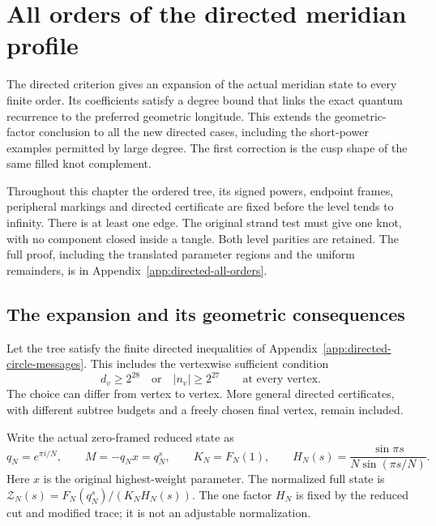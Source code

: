 \chapter{All orders of the directed meridian profile}
\label{ch:directed-all-orders}

The directed criterion gives an expansion of the actual meridian state
to every finite order. Its coefficients satisfy a degree bound that
links the exact quantum recurrence to the preferred geometric
longitude. This extends the geometric-factor conclusion to all the
new directed cases, including the short-power examples permitted by
large degree. The first correction is the cusp shape of the same
filled knot complement.

Throughout this chapter the ordered tree, its signed powers, endpoint
frames, peripheral markings and directed certificate are fixed before
the level tends to infinity. There is at least one edge. The original
strand test must give one knot, with no component closed inside a
tangle. Both level parities are retained. The full proof, including
the translated parameter regions and the uniform remainders, is in
Appendix~\ref{app:directed-all-orders}.

\section{The expansion and its geometric consequences}
\label{dao-ch:statement}

Let the tree satisfy the finite directed inequalities of
Appendix~\ref{app:directed-circle-messages}. This includes the
vertexwise sufficient condition
\begin{equation}\label{dao-ch:sufficient}
 d_v\ge2^{28}\quad\text{or}\quad |n_v|\ge2^{27}
                  \qquad\text{at every vertex}.
\end{equation}
The choice can differ from vertex to vertex. More general directed
certificates, with different subtree budgets and a freely chosen
final vertex, remain included.

Write the actual zero-framed reduced state as
\begin{equation}\label{dao-ch:state}
 q_N=e^{\pi i/N},\qquad M=-q_Nx=q_N^s,\qquad
 K_N=F_N(1),\qquad
 H_N(s)=\frac{\sin\pi s}{N\sin(\pi s/N)}.
\end{equation}
Here $x$ is the original highest-weight parameter. The normalized
full state is $\mathcal Z_N(s)=F_N(q_N^s)/(K_NH_N(s))$.
The one factor $H_N$ is fixed by the reduced cut and modified trace;
it is not an adjustable normalization.


